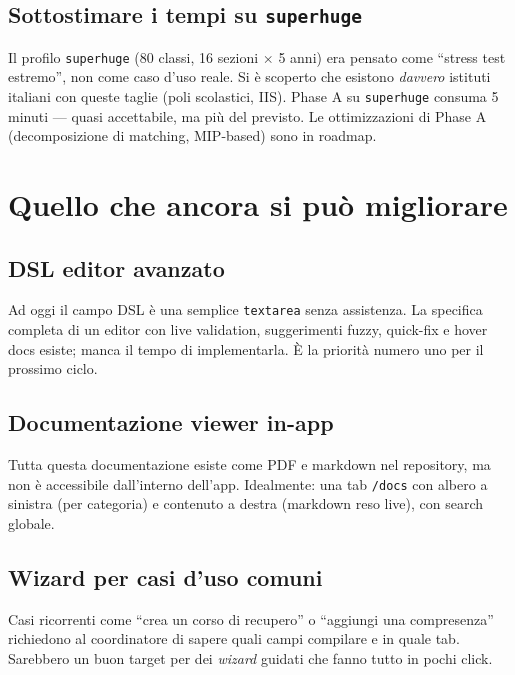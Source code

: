 \subsection{Sottostimare i tempi su \texttt{superhuge}}

Il profilo \texttt{superhuge} (80 classi, 16 sezioni $\times$
5 anni) era pensato come ``stress test estremo'', non come
caso d'uso reale. Si \`e scoperto che esistono \emph{davvero}
istituti italiani con queste taglie (poli scolastici, IIS).
Phase A su \texttt{superhuge} consuma 5 minuti --- quasi
accettabile, ma pi\`u del previsto. Le ottimizzazioni di
Phase A (decomposizione di matching, MIP-based) sono in
roadmap.

\section{Quello che ancora si pu\`o migliorare}

\subsection{DSL editor avanzato}

Ad oggi il campo DSL \`e una semplice \texttt{textarea}
senza assistenza. La specifica completa di un editor con
live validation, suggerimenti fuzzy, quick-fix e hover docs
esiste; manca il tempo di implementarla. \`E la priorit\`a
numero uno per il prossimo ciclo.

\subsection{Documentazione viewer in-app}

Tutta questa documentazione esiste come PDF e markdown nel
repository, ma non \`e accessibile dall'interno dell'app.
Idealmente: una tab \texttt{/docs} con albero a sinistra
(per categoria) e contenuto a destra (markdown reso live),
con search globale.

\subsection{Wizard per casi d'uso comuni}

Casi ricorrenti come ``crea un corso di recupero'' o
``aggiungi una compresenza'' richiedono al coordinatore di
sapere quali campi compilare e in quale tab. Sarebbero un
buon target per dei \emph{wizard} guidati che fanno tutto
in pochi click.

